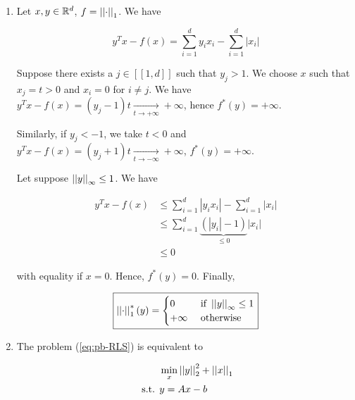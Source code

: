 \documentclass[a4paper, 11pt]{report}
\begin{document}
\begin{enumerate}
    \item Let $x, y \in \mathbb{R}^{d}$, $f = \left|\left| \cdot \right|\right|_{1}$. We have
    
    \[ y^{T} x - f(x) = \sum_{i=1}^{d} y_{i} x_{i} - \sum_{i=1}^{d} \left| x_{i} \right| \]
    
    Suppose there exists a $j \in [\![ 1, d ]\!]$ such that $y_{j} > 1$. We choose $x$ such that $x_{j} = t > 0$ and $x_{i} = 0$ for $i \neq j$. We have $y^{T} x - f(x) = \left( y_{j} - 1 \right) t \underset{t \rightarrow + \infty}{\longrightarrow} + \infty$, hence $f^{*}(y) = + \infty$. 
    
    Similarly, if $y_{j} < -1$, we take $t < 0$ and $y^{T} x - f(x) = \left( y_{j} + 1 \right) t \underset{t \rightarrow - \infty}{\longrightarrow} + \infty$, \ie $f^{*}(y) = + \infty$.
    
    Let suppose $\left|\left| y \right|\right|_{\infty} \leq 1$. We have
    
    \begin{equation*}
        \begin{aligned}
        y^{T} x - f(x) &\leq \sum_{i=1}^{d} \left| y_{i} x_{i} \right| - \sum_{i=1}^{d} \left| x_{i} \right| \\
        &\leq \sum_{i=1}^{d} \underbrace{\left( \left| y_{i} \right| - 1 \right)}_{\leq 0} \left| x_{i} \right| \\
        &\leq 0
        \end{aligned}
    \end{equation*}
    
    with equality if $x = 0$. Hence, $f^{*}(y) = 0$. Finally,
    
    \begin{equation*}
        \boxed{\left|\left| \cdot \right|\right|_{1}^{*}(y) = \begin{cases}
        0 & \text{ if } \left|\left| y \right|\right|_{\infty} \leq 1 \\
        + \infty & \text{ otherwise }
        \end{cases}}
    \end{equation*}
    
    \item The problem (\ref{eq:pb-RLS}) is equivalent to

    \begin{equation}
        \begin{aligned}
        & \min_{x}
        \left|\left| y \right|\right|_{2}^{2} + \left|\left| x \right|\right|_{1} \\
        \text{ s.t. }
        & y = Ax - b
        \end{aligned}
    \end{equation}
    

\end{enumerate}
\end{document}
